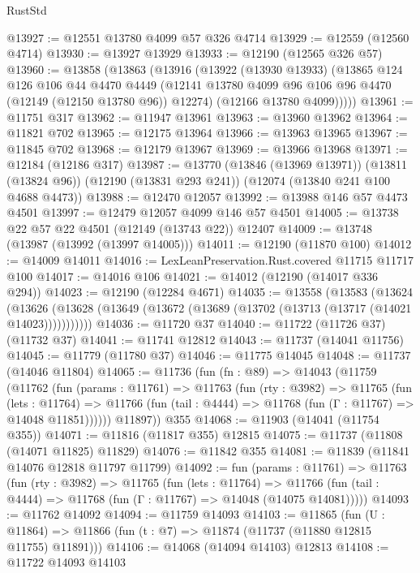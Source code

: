 \begin{lexlean}{RustStd}
\begin{coremodule}
@13927 := @12551 @13780 @4099 @57 @326 @4714
@13929 := @12559 (@12560 @4714)
@13930 := @13927 @13929
@13933 := @12190 (@12565 @326 @57)
@13960 := @13858
    (@13863
      (@13916
        (@13922
          (@13930 @13933)
          (@13865
            @124
            @126
            @106
            @44
            @4470
            @4449
            (@12141 @13780 @4099 @96 @106 @96 @4470 (@12149 (@12150 @13780 @96)) @12274)
            (@12166 @13780 @4099)))))
@13961 := @11751 @317
@13962 := @11947 @13961
@13963 := @13960 @13962
@13964 := @11821 @702
@13965 := @12175 @13964
@13966 := @13963 @13965
@13967 := @11845 @702
@13968 := @12179 @13967
@13969 := @13966 @13968
@13971 := @12184 (@12186 @317)
@13987 := @13770
    (@13846 (@13969 @13971))
    (@13811 (@13824 @96))
    (@12190 (@13831 @293 @241))
    (@12074 (@13840 @241 @100 @4688 @4473))
@13988 := @12470 @12057
@13992 := @13988 @146 @57 @4473 @4501
@13997 := @12479 @12057 @4099 @146 @57 @4501
@14005 := @13738 @22 @57 @22 @4501 (@12149 (@13743 @22)) @12407
@14009 := @13748 (@13987 (@13992 (@13997 @14005)))
@14011 := @12190 (@11870 @100)
@14012 := @14009 @14011
@14016 := LexLeanPreservation.Rust.covered @11715 @11717 @100
@14017 := @14016 @106
@14021 := @14012 (@12190 (@14017 @336 @294))
@14023 := @12190 (@12284 @4671)
@14035 := @13558
    (@13583
      (@13624
        (@13626 (@13628 (@13649 (@13672 (@13689 (@13702 (@13713 (@13717 (@14021 @14023)))))))))))
@14036 := @11720 @37
@14040 := @11722 (@11726 @37) (@11732 @37)
@14041 := @11741 @12812
@14043 := @11737 (@14041 @11756)
@14045 := @11779 (@11780 @37)
@14046 := @11775 @14045
@14048 := @11737 (@14046 @11804)
@14065 := @11736
    (fun (fn : @89) =>
    @14043
      (@11759
        (@11762
          (fun (params : @11761) =>
          @11763
            (fun (rty : @3982) =>
            @11765
              (fun (lets : @11764) =>
              @11766 (fun (tail : @4444) => @11768 (fun (Γ : @11767) => @14048 @11851))))))
        @11897))
    @355
@14068 := @11903 (@14041 (@11754 @355))
@14071 := @11816 (@11817 @355) @12815
@14075 := @11737 (@11808 (@14071 @11825) @11829)
@14076 := @11842 @355
@14081 := @11839 (@11841 @14076 @12818 @11797 @11799)
@14092 := fun (params : @11761) =>
  @11763
    (fun (rty : @3982) =>
    @11765
      (fun (lets : @11764) =>
      @11766 (fun (tail : @4444) => @11768 (fun (Γ : @11767) => @14048 (@14075 @14081)))))
@14093 := @11762 @14092
@14094 := @11759 @14093
@14103 := @11865
    (fun (U : @11864) => @11866 (fun (t : @7) => @11874 (@11737 (@11880 @12815 @11755) @11891)))
@14106 := @14068 (@14094 @14103) @12813
@14108 := @11722 @14093 @14103

\end{coremodule}
\end{lexlean}
